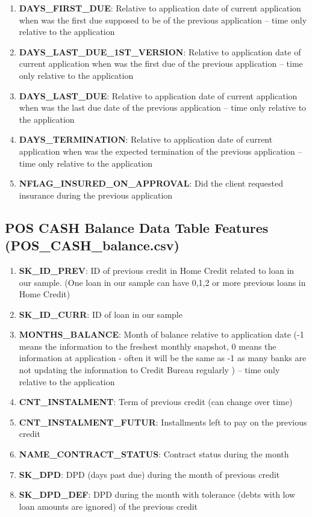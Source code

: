 \documentclass[12pt, letterpaper]{article}
\begin{document}
\begin{appendices}
\begin{enumerate}
  \item \textbf{DAYS_FIRST_DUE}: Relative to application date of current application when was the first due supposed to be of the previous application -- time only relative to the application
  \item \textbf{DAYS_LAST_DUE_1ST_VERSION}: Relative to application date of current application when was the first due of the previous application -- time only relative to the application
  \item \textbf{DAYS_LAST_DUE}: Relative to application date of current application when was the last due date of the previous application -- time only relative to the application
  \item \textbf{DAYS_TERMINATION}: Relative to application date of current application when was the expected termination of the previous application -- time only relative to the application
  \item \textbf{NFLAG_INSURED_ON_APPROVAL}: Did the client requested insurance during the previous application
\end{enumerate}

\subsection{POS CASH Balance Data Table Features (POS_CASH_balance.csv)}
\begin{enumerate}
  \item \textbf{SK_ID_PREV}: ID of previous credit in Home Credit related to loan in our sample. (One loan in our sample can have 0,1,2 or more previous loans in Home Credit)
  \item \textbf{SK_ID_CURR}: ID of loan in our sample
  \item \textbf{MONTHS_BALANCE}: Month of balance relative to application date (-1 means the information to the freshest monthly snapshot, 0 means the information at application - often it will be the same as -1 as many banks are not updating the information to Credit Bureau regularly ) -- time only relative to the application
  \item \textbf{CNT_INSTALMENT}: Term of previous credit (can change over time)
  \item \textbf{CNT_INSTALMENT_FUTUR}: Installments left to pay on the previous credit
  \item \textbf{NAME_CONTRACT_STATUS}: Contract status during the month
  \item \textbf{SK_DPD}: DPD (days past due) during the month of previous credit
  \item \textbf{SK_DPD_DEF}: DPD during the month with tolerance (debts with low loan amounts are ignored) of the previous credit
\end{enumerate}


\end{appendices}
\end{document}
